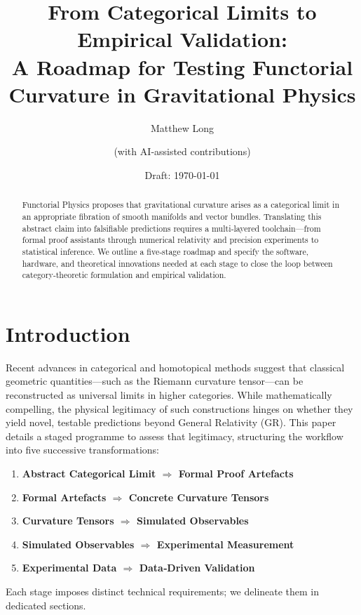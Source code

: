 \documentclass[11pt]{article}
\title{From Categorical Limits to Empirical Validation:\\A Roadmap for Testing Functorial Curvature in Gravitational Physics}
\author[1]{Matthew Long}
\author[2]{(with AI‑assisted contributions)}
\affil[1]{Magneton Labs, USA}
\affil[2]{OpenAI ChatGPT o3}
\date{Draft: \today}
\begin{document}
\maketitle

\begin{abstract}
Functorial Physics proposes that gravitational curvature arises as a categorical limit in an appropriate fibration of smooth manifolds and vector bundles. Translating this abstract claim into falsifiable predictions requires a multi‑layered toolchain—from formal proof assistants through numerical relativity and precision experiments to statistical inference. We outline a five‑stage roadmap and specify the software, hardware, and theoretical innovations needed at each stage to close the loop between category‑theoretic formulation and empirical validation.
\end{abstract}

\tableofcontents

\section{Introduction}
Recent advances in categorical and homotopical methods suggest that classical geometric quantities—such as the Riemann curvature tensor—can be reconstructed as universal limits in higher categories. While mathematically compelling, the physical legitimacy of such constructions hinges on whether they yield novel, testable predictions beyond General Relativity (GR). This paper details a staged programme to assess that legitimacy, structuring the workflow into five successive transformations:

\begin{enumerate}
  \item \textbf{Abstract Categorical Limit \(\Rightarrow\) Formal Proof Artefacts}
  \item \textbf{Formal Artefacts \(\Rightarrow\) Concrete Curvature Tensors}
  \item \textbf{Curvature Tensors \(\Rightarrow\) Simulated Observables}
  \item \textbf{Simulated Observables \(\Rightarrow\) Experimental Measurement}
  \item \textbf{Experimental Data \(\Rightarrow\) Data‑Driven Validation}
\end{enumerate}

Each stage imposes distinct technical requirements; we delineate them in dedicated sections.
\end{document}
